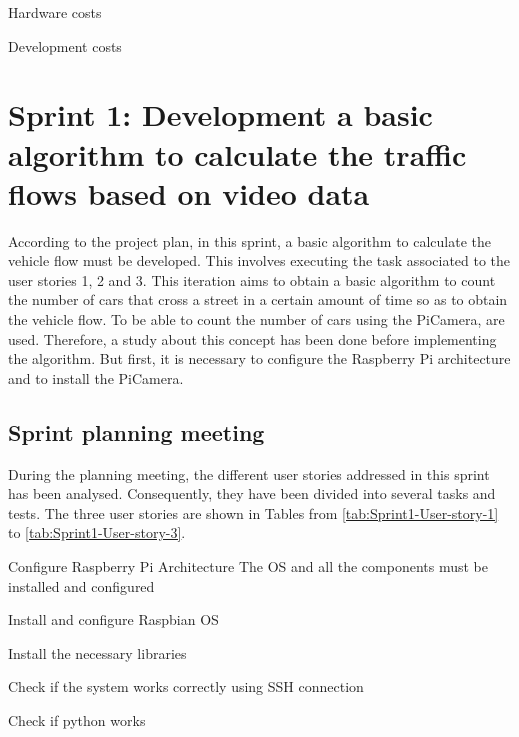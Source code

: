 \begin{table}[hp]
	\centering
	{\small
		
	}
	\caption{Hardware costs}
	\label{tab:Hardware-Costs}
\end{table}

\begin{table}[hp]
	\centering
	{\small
		
	}
	\caption{Development costs}
	\label{tab:Development-Costs}
\end{table}



\section{Sprint 1: Development a basic algorithm to calculate the traffic flows based on video data}
\label{Section:Sprint1}
According to the project plan, in this sprint, a basic algorithm to calculate the vehicle flow must be developed. This involves executing the task associated to the user stories 1, 2 and 3. This iteration aims to obtain a basic algorithm to count the number of cars that cross a street in a certain amount of time so as to obtain the vehicle flow.  To be able to count the number of cars using the PiCamera,  are used. Therefore, a study about this concept has been done before implementing the algorithm. But first, it is necessary to configure the Raspberry Pi architecture and to install the PiCamera. 

\subsection{Sprint planning meeting}
During the planning meeting, the different user stories addressed in this sprint has been analysed. Consequently, they have been divided into several tasks and tests. The three user stories are shown in Tables from \ref{tab:Sprint1-User-story-1} to \ref{tab:Sprint1-User-story-3}.

{Configure Raspberry Pi Architecture}
{The \ac{OS} and all the components must be installed and configured}
{	\item Install and configure Raspbian \ac{OS}
	\item Install the necessary libraries
}{	\item Check if the system works correctly using SSH connection
	\item Check if python works
}

